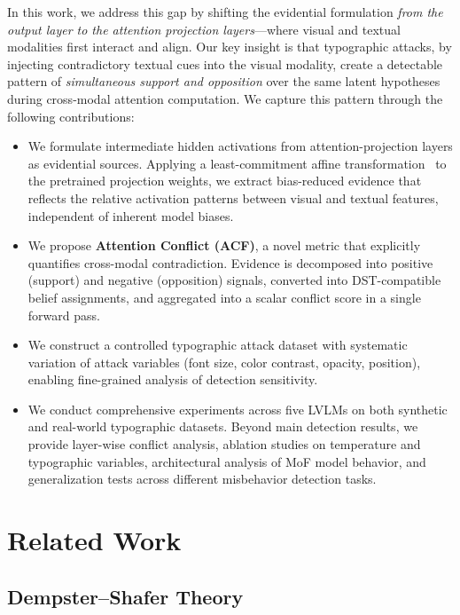 \documentclass[preprint,12pt]{elsarticle}
\begin{document}
In this work, we address this gap by shifting the evidential formulation \emph{from the output layer to the attention projection layers}---where visual and textual modalities first interact and align. Our key insight is that typographic attacks, by injecting contradictory textual cues into the visual modality, create a detectable pattern of \emph{simultaneous support and opposition} over the same latent hypotheses during cross-modal attention computation. We capture this pattern through the following contributions:

\begin{itemize}[leftmargin=*]
    \item We formulate intermediate hidden activations from attention-projection layers as evidential sources. Applying a least-commitment affine transformation~\cite{smets1993belief} to the pretrained projection weights, we extract bias-reduced evidence that reflects the relative activation patterns between visual and textual features, independent of inherent model biases.
    \item We propose \textbf{Attention Conflict (ACF)}, a novel metric that explicitly quantifies cross-modal contradiction. Evidence is decomposed into positive (support) and negative (opposition) signals, converted into DST-compatible belief assignments, and aggregated into a scalar conflict score in a single forward pass.
    \item We construct a controlled typographic attack dataset with systematic variation of attack variables (font size, color contrast, opacity, position), enabling fine-grained analysis of detection sensitivity.
    \item We conduct comprehensive experiments across five LVLMs on both synthetic and real-world typographic datasets. Beyond main detection results, we provide layer-wise conflict analysis, ablation studies on temperature and typographic variables, architectural analysis of MoF model behavior, and generalization tests across different misbehavior detection tasks.
\end{itemize}

\section{Related Work}

\subsection{Dempster--Shafer Theory}
\end{document}
